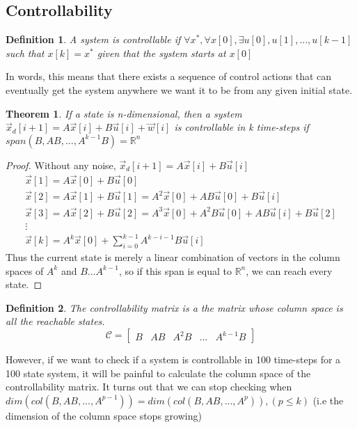 \documentclass{article}
\newtheorem{theorem}{Theorem}
\newtheorem{definition}{Definition}
\newtheorem{proof}{Proof}
\begin{document}
\subsection{Controllability}
\begin{definition}
    A system is controllable if $\forall x^*, \forall x[0], \exists u[0],u[1],...,u[k-1]$ such that $x[k]=x^*$ given that the system starts at $x[0]$
\end{definition}
In words, this means that there exists a sequence of control actions that can eventually get the system anywhere we want it to be from any given initial state.
\begin{theorem}
    If a state is n-dimensional, then a system $\vec{x}_d[i+1]=A\vec{x}[i]+B\vec{u}[i]+\vec{w}[i]$ is controllable in k time-steps if $span(B, AB, ..., A^{k-1}B)=\mathbb{R}^n$
\end{theorem}
\begin{proof}
    Without any noise, $\vec{x}_d[i+1]=A\vec{x}[i]+B\vec{u}[i]$
    \[
        \begin{array}{c}
            \vec{x}[1]=A\vec{x}[0]+B\vec{u}[0]\\
            \vec{x}[2]=A\vec{x}[1]+B\vec{u}[1] = A^2\vec{x}[0]+AB\vec{u}[0]+B\vec{u}[i]\\
            \vec{x}[3]=A\vec{x}[2]+B\vec{u}[2] = A^3\vec{x}[0]+A^2B\vec{u}[0]+AB\vec{u}[i]+B\vec{u}[2]\\
            \vdots\\
            \vec{x}[k]=A^k\vec{x}[0]+\sum_{i=0}^{k-1}{A^{k-i-1}B\vec{u}[i]}
        \end{array}
        \]
    Thus the current state is merely a linear combination of vectors in the column spaces of $A^k$ and $B...A^{k-1}$, so if this span is equal to $\mathbb{R}^n$, we can reach every state.
\end{proof}
\begin{definition}
    The controllability matrix is a the matrix whose column space is all the reachable states.
    \[
        \mathcal{C} = \left[
            \begin{array}{c|c|c|c|c}
                B & AB & A^2B & ... & A^{k-1}B
            \end{array}
        \right]
        \]
\end{definition}
However, if we want to check if a system is controllable in 100 time-steps for a 100 state system, it will be painful to calculate the column space of the controllability matrix.
It turns out that we can stop checking when $dim(col(B, AB,...,A^{p-1}))=dim(col(B, AB, ..., A^p)), (p \leq k)$ (i.e the dimension of the column space stops growing)
\end{document}
